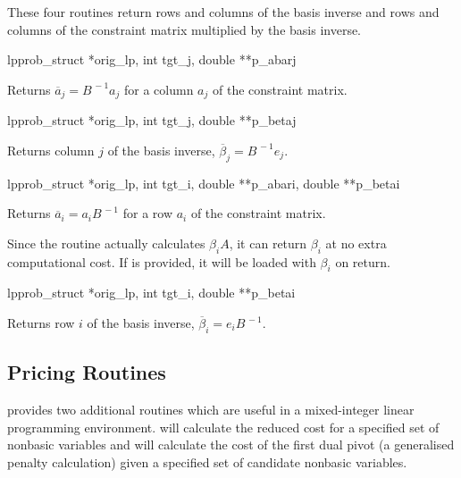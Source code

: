 
These four routines return rows and columns of the basis inverse and rows
and columns of the constraint matrix multiplied by the basis inverse.

\begin{subrdoc}
  \item
	  {lpprob_struct *orig_lp, int tgt_j, double **p_abarj}

  Returns $\overline{a}_j = B^{\,-1}a_j$ for a column $a_j$ of the constraint
  matrix.

  \item
	  {lpprob_struct *orig_lp, int tgt_j, double **p_betaj}

  Returns column $j$ of the basis inverse, $\overline{\beta}_j = B^{\,-1}e_j$.

  \item
	  {lpprob_struct *orig_lp, int tgt_i, double **p_abari,
	   double **p_betai}

  Returns $\overline{a}_i = a_i B^{\,-1}$ for a row $a_i$ of the constraint
  matrix.

  Since the routine actually calculates $\beta_i A$, it can return
  $\beta_i$ at no extra computational cost.
  If  is provided, it will be loaded with $\beta_i$ on return.

  \item
	  {lpprob_struct *orig_lp, int tgt_i, double **p_betai}

  Returns row $i$ of the basis inverse, $\overline{\beta}_i = e_i B^{\,-1}$.
\end{subrdoc}

\subsection{Pricing Routines}
\label{sec:PricingRoutines}

\dylp provides two additional routines which are useful in a mixed-integer
linear programming environment.
 will calculate the reduced cost for a specified set of
nonbasic variables
and  will calculate the cost of the first dual pivot
(a generalised penalty calculation) given a specified set of candidate nonbasic
variables.

